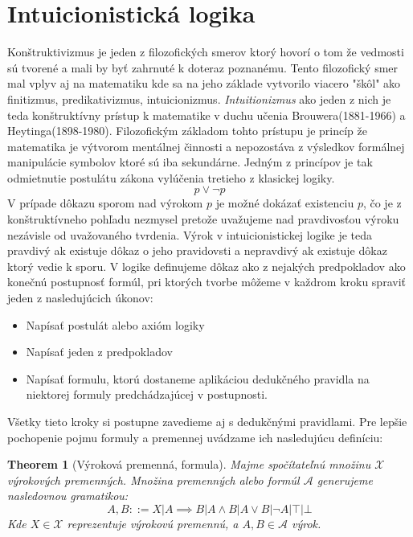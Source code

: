 \documentclass[a4paper,10pt,oneside]{report}%
\newtheorem{theorem}{Theorem}
\begin{document}
\section{Intuicionistická logika}
    Konštruktivizmus je jeden z filozofických smerov ktorý hovorí o tom že vedmosti
sú tvorené a mali by byť zahrnuté k doteraz poznanému.
    Tento filozofický smer mal vplyv aj na matematiku kde sa na jeho základe
vytvorilo viacero "škôl" ako finitizmus, predikativizmus, intuicionizmus.
    \emph{Intuitionizmus} ako jeden z nich je teda konštruktívny prístup k matematike
v duchu učenia Brouwera(1881-1966) a Heytinga(1898-1980).
    Filozofickým základom tohto prístupu je princíp že matematika je výtvorom mentálnej
činnosti a nepozostáva z výsledkov formálnej manipulácie symbolov ktoré sú iba
sekundárne.
    Jedným z princípov je tak odmietnutie postulátu zákona vylúčenia tretieho
z klasickej logiky.
\begin{equation}
    p \vee \neg p
\end{equation}
    V prípade dôkazu sporom nad výrokom $p$ je možné dokázať existenciu $p$,
čo je z konštruktívneho pohľadu nezmysel pretože uvažujeme nad pravdivosťou
    výroku nezávisle od uvažovaného tvrdenia.
Výrok v intuicionistickej logike je teda pravdivý ak existuje dôkaz o jeho pravidovsti
a nepravdivý ak existuje dôkaz ktorý vedie k sporu.
    V logike definujeme dôkaz ako z nejakých predpokladov ako konečnú postupnosť
formúl, pri ktorých tvorbe môžeme v každrom kroku spraviť jeden z nasledujúcich
úkonov:
\begin{itemize}
    \item Napísať postulát alebo axióm logiky
    \item Napísať jeden z predpokladov
    \item Napísať formulu, ktorú dostaneme aplikáciou dedukčného pravidla na niektorej
formuly predchádzajúcej v postupnosti.
\end{itemize}
    Všetky tieto kroky si postupne zavedieme aj s dedukčnými pravidlami.
    Pre lepšie pochopenie pojmu formuly a premennej uvádzame ich nasledujúcu definíciu:
\begin{theorem}[Výroková premenná, formula]
    Majme spočítateľnú množinu $\mathcal{X}$ výrokových premenných. Množina premenných
    alebo formúl $\mathcal{A}$ generujeme nasledovnou gramatikou:
    \begin{equation}
        A, B ::= X | A \implies B | A \wedge B | A \vee B | \neg A | \top | \bot
    \end{equation}
    Kde $X \in \mathcal{X}$ reprezentuje výrokovú premennú, a $A, B \in \mathcal{A}$
    výrok.
\end{theorem}
\end{document}
